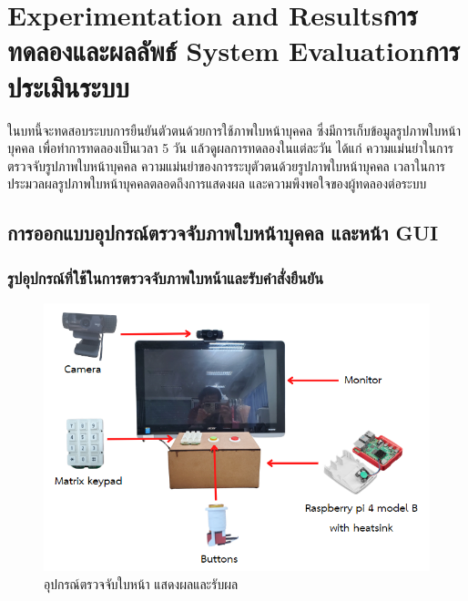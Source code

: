 \chapter{\ifproject%
\ifenglish Experimentation and Results\else การทดลองและผลลัพธ์\fi
\else%
\ifenglish System Evaluation\else การประเมินระบบ\fi
\fi}

ในบทนี้จะทดสอบระบบการยืนยันตัวตนด้วยการใช้ภาพใบหน้าบุคคล ซึ่งมีการเก็บข้อมูลรูปภาพใบหน้าบุคคล เพื่อทำการทดลองเป็นเวลา 5 วัน แล้วดูผลการทดลองในแต่ละวัน ได้แก่ 
ความแม่นยำในการตรวจจับรูปภาพใบหน้าบุคคล ความแม่นยำของการระบุตัวตนด้วยรูปภาพใบหน้าบุคคล เวลาในการประมวลผลรูปภาพใบหน้าบุคคลตลอดถึงการแสดงผล 
และความพึงพอใจของผู้ทดลองต่อระบบ

\section{การออกแบบอุปกรณ์ตรวจจับภาพใบหน้าบุคคล และหน้า GUI}

\subsection{รูปอุปกรณ์ที่ใช้ในการตรวจจับภาพใบหน้าและรับคำสั่งยืนยัน}

\begin{figure}[!ht]
  \begin{center}
    \includegraphics[scale=.6]{pic/overall_module.png}
    \caption[อุปกรณ์ตรวจจับใบหน้า แสดงผลและรับผล]{อุปกรณ์ตรวจจับใบหน้า แสดงผลและรับผล}
    \label{fig:module_pi}
  \end{center}
\end{figure}


